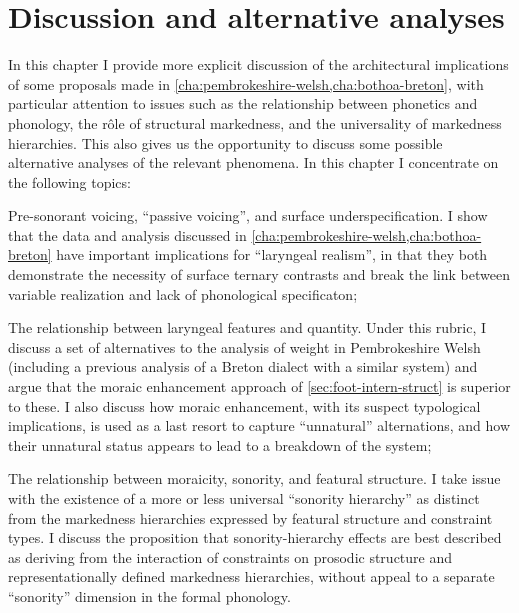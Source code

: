 \chapter{Discussion and alternative analyses}
\label{cha:disc-altern-analys}

In this chapter I provide more explicit discussion of the architectural implications of some proposals made in \cref{cha:pembrokeshire-welsh,cha:bothoa-breton}, with particular attention to issues such as the relationship between phonetics and phonology, the rôle of structural markedness, and the universality of markedness hierarchies. This also gives us the opportunity to discuss some possible alternative analyses of the relevant phenomena. In this chapter I concentrate on the following topics:

\begin{itemize*}
\item Pre-sonorant voicing, \enquote{passive voicing}, and surface underspecification. I show that the data and analysis discussed in \cref{cha:pembrokeshire-welsh,cha:bothoa-breton} have important implications for \enquote{laryngeal realism}, in that they both demonstrate the necessity of surface ternary contrasts and break the link between variable realization and lack of phonological specificaton;
\item The relationship between laryngeal features and quantity. Under this rubric, I discuss a set of alternatives to the analysis of weight in Pembrokeshire Welsh (including a previous analysis of a Breton dialect with a similar system) and argue that the moraic enhancement approach of  \cref{sec:foot-intern-struct} is superior to these. I also discuss how moraic enhancement, with its suspect typological implications, is used as a last resort to capture \enquote{unnatural} alternations, and how their unnatural status appears to lead to a breakdown of the system;
\item The relationship between moraicity, sonority, and featural structure. I take issue with the existence of a more or less universal \enquote{sonority hierarchy} as distinct from the markedness hierarchies expressed by featural structure and constraint types. I discuss the proposition that sonority\hyp hierarchy effects are best described as deriving from the interaction of constraints on prosodic structure and representationally defined markedness hierarchies, without appeal to a separate \enquote{sonority} dimension in the formal phonology.
\end{itemize*}

